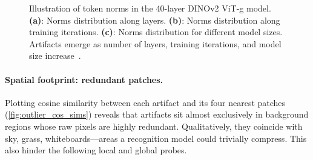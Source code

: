 \documentclass{article}
\newcommand{\citep}{\parencite}
\begin{document}
\begin{figure}[t]
  \centering
  \caption{
    Illustration of token norms in the 40-layer DINOv2 ViT-g model.
    \textbf{(a)}: Norms distribution along layers.
    \textbf{(b)}: Norms distribution along training iterations.
    \textbf{(c)}: Norms distribution for different model sizes. 
    Artifacts emerge as number of layers, training iterations, and model size increase~\citep{darcetVisionTransformersNeed2024}.}
  \label{fig:factors_choice}
\end{figure}

\paragraph{Spatial footprint: redundant patches.}
Plotting cosine similarity between each artifact and its four nearest patches (\cref{fig:outlier_cos_sims}) reveals that artifacts sit almost exclusively in background regions whose raw pixels are highly redundant.
Qualitatively, they coincide with sky, grass, whiteboards—areas a recognition model could trivially compress.
This also hinder the following local and global probes.
\end{document}
